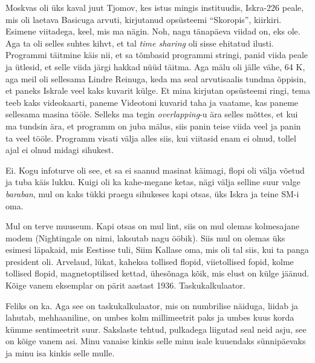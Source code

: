 Moskvas oli üks kaval juut Tjomov, kes istus mingis instituudis, 
Iskra-226 peale, mis oli laetava Basicuga arvuti, 
kirjutanud opsüsteemi \enquote{Skoropis}, kiirkiri. Esimene viitadega, keel, 
mis ma nägin. Noh, nagu tänapäeva viidad on, eks ole. Aga ta oli selles suhtes 
kihvt, et tal \emph{time sharing} oli sisse ehitatud ilusti. Programmi täitmine 
käis nii, et sa tõmbasid programmi stringi, panid viida peale ja ütlesid, et 
selle viida järgi hakkad nüüd täitma. Aga mälu oli jälle vähe, 64 K, aga meil 
oli sellesama Lindre Reinuga, keda ma seal 
arvutisaalis tundma õppisin, et paneks Iskrale veel kaks kuvarit külge. Et mina 
kirjutan opsüsteemi ringi, tema teeb kaks videokaarti, paneme Videotoni kuvarid 
taha ja vaatame, kas paneme sellesama masina tööle.  Selleks ma tegin 
\emph{overlapping}-u ära selles mõttes, et kui ma tundsin ära, et programm on 
juba mälus, siis panin teise viida veel ja panin ta veel tööle. Programm visati 
välja alles siis, kui viitasid enam ei olnud, tollel ajal ei olnud midagi 
sihukest. 


Ei. Kogu infoturve oli see, et sa ei saanud masinat käimagi, flopi oli välja 
võetud ja tuba käis lukku. Kuigi oli ka  kahe-megane ketas, nägi välja selline 
suur valge \emph{baraban}, mul on kaks tükki praegu sihukeses kapi otsas, üks 
Iskra ja teine SM-i oma. 

Mul on terve muuseum. Kapi otsas on mul lint, siis on mul olemas kolmesajane 
modem (Nightingale on nimi, laksutab nagu ööbik). Siis mul on olemas üks 
esimesi läpakaid, mis Eestisse tuli, Siim Kallase oma, 
mis oli tal siis, kui ta panga president oli. Arvelaud, lükat, kaheksa tollised 
flopid, viietollised fopid, kolme tollised flopid, magnetoptilised kettad, 
ühesõnaga kõik, mis elust on külge jäänud. Kõige vanem eksemplar on pärit 
aastast 1936. Taskukalkulaator.


Feliks on ka. Aga see on taskukalkulaator, mis on numbrilise näiduga, liidab ja 
lahutab, mehhaaniline, on umbes kolm millimeetrit paks ja umbes kuus korda 
kümme sentimeetrit suur. Sakslaste tehtud, pulkadega liigutad seal neid asju, 
see on kõige vanem asi. Minu vanaise kinkis selle minu isale kuuendaks 
sünnipäevaks ja minu isa kinkis selle mulle. 

